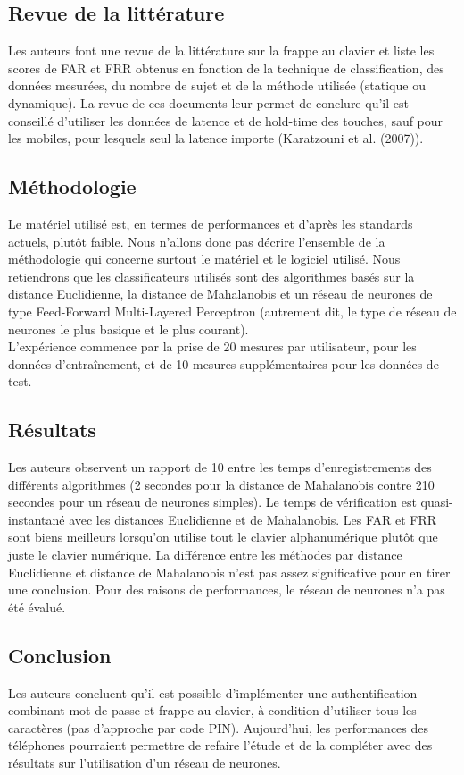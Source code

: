 \subsection{Revue de la littérature}

Les auteurs font une revue de la littérature sur la frappe au clavier et liste les scores de FAR et FRR obtenus en fonction de la technique de classification, des données mesurées, du nombre de sujet et de la méthode utilisée (statique ou dynamique). La revue de ces documents leur permet de conclure qu'il est conseillé d'utiliser les données de latence et de hold-time des touches, sauf pour les mobiles, pour lesquels seul la latence importe (Karatzouni et al. (2007)).

\subsection{Méthodologie}

Le matériel utilisé est, en termes de performances et d'après les standards actuels, plutôt faible. Nous n'allons donc pas décrire l'ensemble de la méthodologie qui concerne surtout le matériel et le logiciel utilisé. Nous retiendrons que les classificateurs utilisés sont des algorithmes basés sur la distance Euclidienne, la distance de Mahalanobis et un réseau de neurones de type Feed-Forward Multi-Layered Perceptron (autrement dit, le type de réseau de neurones le plus basique et le plus courant).\\

L'expérience commence par la prise de 20 mesures par utilisateur, pour les données d'entraînement, et de 10 mesures supplémentaires pour les données de test.

\subsection{Résultats}

Les auteurs observent un rapport de 10 entre les temps d'enregistrements des différents algorithmes (2 secondes pour la distance de Mahalanobis contre 210 secondes pour un réseau de neurones simples). Le temps de vérification est quasi-instantané avec les distances Euclidienne et de Mahalanobis. Les FAR et FRR sont biens meilleurs lorsqu'on utilise tout le clavier alphanumérique plutôt que juste le clavier numérique. La différence entre les méthodes par distance Euclidienne et distance de Mahalanobis n'est pas assez significative pour en tirer une conclusion. Pour des raisons de performances, le réseau de neurones n'a pas été évalué.

\subsection{Conclusion}

Les auteurs concluent qu'il est possible d'implémenter une authentification combinant mot de passe et frappe au clavier, à condition d'utiliser tous les caractères (pas d'approche par code PIN). Aujourd'hui, les performances des téléphones pourraient permettre de refaire l'étude et de la compléter avec des résultats sur l'utilisation d'un réseau de neurones.
